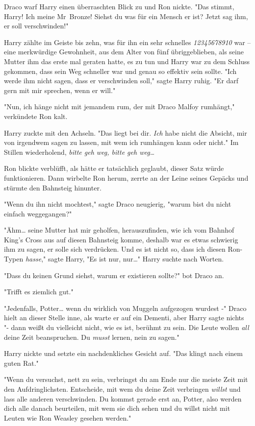 {Draco warf Harry einen überraschten Blick zu und Ron nickte. "Das stimmt, Harry! Ich meine Mr~Bronze! Siehst du was für ein Mensch er ist? Jetzt sag ihm, er soll verschwinden!"

Harry zählte im Geiste bis zehn, was für ihn ein sehr schnelles \emph{12345678910} war -- eine merkwürdige Gewohnheit, aus dem Alter von fünf übriggeblieben, als seine Mutter ihm das erste mal geraten hatte, es zu tun und Harry war zu dem Schluss gekommen, dass sein Weg schneller war und genau so effektiv sein sollte. "Ich werde ihm nicht sagen, dass er verschwinden soll," sagte Harry ruhig. "Er darf gern mit mir sprechen, wenn er will."

"Nun, ich hänge nicht mit jemandem rum, der mit Draco Malfoy rumhängt," verkündete Ron kalt.

Harry zuckte mit den Achseln. "Das liegt bei dir. \emph{Ich} habe nicht die Absicht, mir von irgendwem sagen zu lassen, mit wem ich rumhängen kann oder nicht." Im Stillen wiederholend, \emph{bitte geh weg, bitte geh weg…}

Ron blickte verblüfft, als hätte er tatsächlich geglaubt, dieser Satz würde funktionieren. Dann wirbelte Ron herum, zerrte an der Leine seines Gepäcks und stürmte den Bahnsteig hinunter.

"Wenn du ihn nicht mochtest," sagte Draco neugierig, "warum bist du nicht einfach weggegangen?"

"Ähm… seine Mutter hat mir geholfen, herauszufinden, wie ich vom Bahnhof King's Cross aus auf diesen Bahnsteig komme, deshalb war es etwas schwierig ihm zu sagen, er solle sich verdrücken. Und es ist nicht so, dass ich diesen Ron-Typen \emph{hasse}," sagte Harry, "Es ist nur, nur…" Harry suchte nach Worten.

"Dass du keinen Grund siehst, warum er existieren sollte?" bot Draco an.

"Trifft es ziemlich gut."

"Jedenfalls, Potter… wenn du wirklich von Muggeln aufgezogen wurdest -" Draco hielt an dieser Stelle inne, als warte er auf ein Dementi, aber Harry sagte nichts "- dann weißt du vielleicht nicht, wie es ist, berühmt zu sein. Die Leute wollen \emph{all} deine Zeit beanspruchen. Du \emph{musst} lernen, nein zu sagen."

Harry nickte und setzte ein nachdenkliches Gesicht auf. "Das klingt nach einem guten Rat."

"Wenn du versuchst, nett zu sein, verbringst du am Ende nur die meiste Zeit mit den Aufdringlichsten. Entscheide, mit wem du deine Zeit verbringen \emph{willst} und lass alle anderen verschwinden. Du kommst gerade erst an, Potter, also werden dich alle danach beurteilen, mit wem sie dich sehen und du willst nicht mit Leuten wie Ron Weasley gesehen werden."

}
